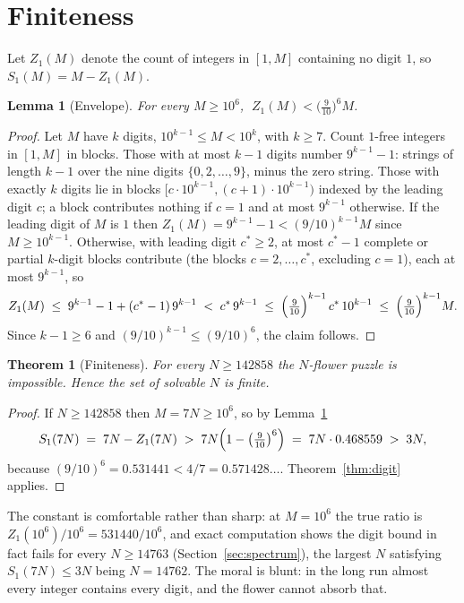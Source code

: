 \documentclass[11pt]{article}
\newtheorem{theorem}{Theorem}
\newtheorem{lemma}{Lemma}
\theoremstyle{definition}
\theoremstyle{remark}
\newcommand{\Sd}[2]{S_{#1}(#2)}
\begin{document}
\section{Finiteness}\label{sec:finite}

Let $Z_1(M)$ denote the count of integers in $[1,M]$ containing no digit $1$, so $\Sd{1}{M}=M-Z_1(M)$.

\begin{lemma}[Envelope]\label{lem:envelope}
For every $M\ge 10^6$, $\;Z_1(M) < \bigl(\tfrac{9}{10}\bigr)^{6} M$.
\end{lemma}

\begin{proof}
Let $M$ have $k$ digits, $10^{k-1}\le M<10^k$, with $k\ge 7$. Count $1$-free integers in $[1,M]$ in blocks. Those with at most $k-1$ digits number $9^{k-1}-1$: strings of length $k-1$ over the nine digits $\{0,2,\dots,9\}$, minus the zero string. Those with exactly $k$ digits lie in blocks $[c\cdot 10^{k-1},(c+1)\cdot 10^{k-1})$ indexed by the leading digit $c$; a block contributes nothing if $c=1$ and at most $9^{k-1}$ otherwise. If the leading digit of $M$ is $1$ then $Z_1(M)=9^{k-1}-1<(9/10)^{k-1}M$ since $M\ge 10^{k-1}$. Otherwise, with leading digit $c^*\ge 2$, at most $c^*-1$ complete or partial $k$-digit blocks contribute (the blocks $c=2,\dots,c^*$, excluding $c=1$), each at most $9^{k-1}$, so
\[
Z_1(M)\;\le\; 9^{k-1}-1 + (c^*-1)\,9^{k-1} \;<\; c^*\,9^{k-1} \;\le\; \Bigl(\tfrac{9}{10}\Bigr)^{k-1}\, c^*\,10^{k-1}\;\le\;\Bigl(\tfrac{9}{10}\Bigr)^{k-1} M .
\]
Since $k-1\ge 6$ and $(9/10)^{k-1}\le (9/10)^6$, the claim follows.
\end{proof}

\begin{theorem}[Finiteness]\label{thm:finite}
For every $N\ge 142858$ the $N$-flower puzzle is impossible. Hence the set of solvable $N$ is finite.
\end{theorem}

\begin{proof}
If $N\ge 142858$ then $M=7N\ge 10^6$, so by Lemma~\ref{lem:envelope}
\[
\Sd{1}{7N} \;=\; 7N - Z_1(7N) \;>\; 7N\Bigl(1-\bigl(\tfrac{9}{10}\bigr)^{6}\Bigr) \;=\; 7N\cdot 0.468559 \;>\; 3N,
\]
because $(9/10)^6 = 0.531441 < 4/7 = 0.571428\ldots$. Theorem~\ref{thm:digit} applies.
\end{proof}

The constant is comfortable rather than sharp: at $M=10^6$ the true ratio is $Z_1(10^6)/10^6 = 531440/10^6$, and exact computation shows the digit bound in fact fails for every $N\ge 14763$ (Section~\ref{sec:spectrum}), the largest $N$ satisfying $\Sd{1}{7N}\le 3N$ being $N=14762$. The moral is blunt: in the long run almost every integer contains every digit, and the flower cannot absorb that.
\end{document}
